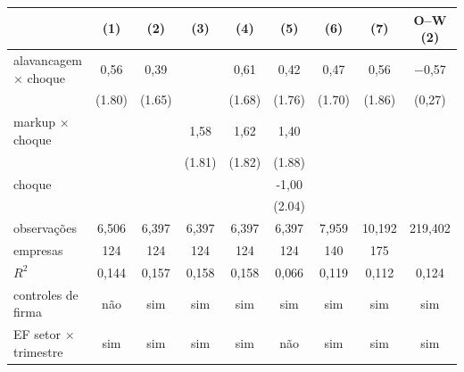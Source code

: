 \begin{tabular}{lccccccc|c}
\toprule
 & (1) & (2) & (3) & (4) & (5) & (6) & (7) & O--W (2) \\
\midrule
alavancagem $\times$ choque & 0{,}56 & 0{,}39 &  & 0{,}61 & 0{,}42 & 0{,}47 & 0{,}56 & $-$0,57 \\
 & (1.80) & (1.65) &  & (1.68) & (1.76) & (1.70) & (1.86) & (0,27) \\
markup $\times$ choque &  &  & 1{,}58 & 1{,}62 & 1{,}40 &  &  &  \\
 &  &  & (1.81) & (1.82) & (1.88) &  &  &  \\
choque &  &  &  &  & -1{,}00 &  &  &  \\
 &  &  &  &  & (2.04) &  &  &  \\
\midrule
observações & 6{,}506 & 6{,}397 & 6{,}397 & 6{,}397 & 6{,}397 & 7{,}959 & 10{,}192 & 219{,}402 \\
empresas & 124 & 124 & 124 & 124 & 124 & 140 & 175 &  \\
$R^2$ & 0{,}144 & 0{,}157 & 0{,}158 & 0{,}158 & 0{,}066 & 0{,}119 & 0{,}112 & 0,124 \\
controles de firma & não & sim & sim & sim & sim & sim & sim & sim \\
EF setor $\times$ trimestre & sim & sim & sim & sim & não & sim & sim & sim \\
\bottomrule
\end{tabular}
